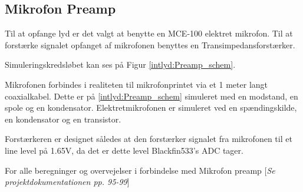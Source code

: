\subsection{Mikrofon Preamp}
Til at opfange lyd er det valgt at benytte en MCE-100 elektret mikrofon. Til at forstærke signalet opfanget af mikrofonen benyttes en Transimpedansforstærker. 

Simuleringskredsløbet kan ses på Figur \ref{intlyd:Preamp_schem}.	


Mikrofonen forbindes i realiteten til mikrofonprintet via et 1 meter langt coaxialkabel. Dette er på \ref{intlyd:Preamp_schem} simuleret med en modstand, en spole og en kondensator. Elektretmikrofonen er simuleret ved en spændingskilde, en kondensator og en transistor. 

Forstærkeren er designet således at den forstærker signalet fra mikrofonen til et line level på 1.65V, da det er dette level Blackfin533's ADC tager. 

For alle beregninger og overvejelser i forbindelse med Mikrofon preamp [\textit{Se projektdokumentationen pp. 95-99}]